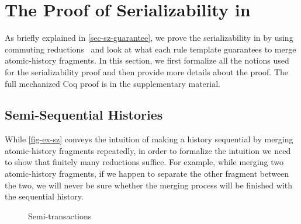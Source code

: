 \documentclass[sigplan,10pt,review,anonymous,screen]{acmart}\settopmatter{printfolios=true,printccs=false,printacmref=false}
\begin{document}




\clearpage
\appendix

\section{The Proof of Serializability in \hemiola{}}
\label{sec-appx-proof-sz}

As briefly explained in \autoref{sec-sz-guarantee}, we prove the serializability in \hemiola{} by using commuting reductions~\cite{reduction} and look at what each rule template guarantees to merge atomic-history fragments.
In this section, we first formalize all the notions used for the serializability proof and then provide more details about the proof.
The full mechanized Coq proof is in the supplementary material.

\subsection{Semi-Sequential Histories}
\label{sec-appx-semi-sequential}

While \autoref{fig-ex-sz} conveys the intuition of making a history sequential by merging atomic-history fragments repeatedly, in order to formalize the intuition we need to show that finitely many reductions suffice.
For example, while merging two atomic-history fragments, if we happen to separate the other fragment between the two, we will never be sure whether the merging process will be finished with the sequential history.

\begin{figure}[h]
  \centering
  \setlength\arraycolsep{2pt}
  \caption{Semi-transactions}
  \label{fig-semi-trs}
\end{figure}
\end{document}
